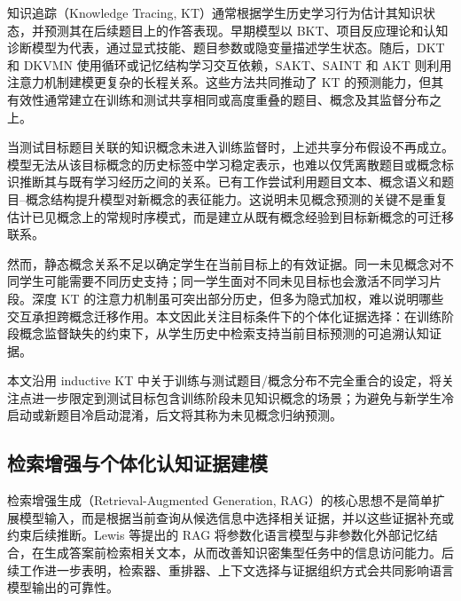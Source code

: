 \documentclass[UTF8,a4paper,12pt]{ctexart}
\numberwithin{table}{section}
\begin{document}
知识追踪（Knowledge Tracing, KT）通常根据学生历史学习行为估计其知识状态，并预测其在后续题目上的作答表现。早期模型以 BKT、项目反应理论和认知诊断模型为代表，通过显式技能、题目参数或隐变量描述学生状态\citep{corbett1995knowledge,chen2021irt,pavlik2009pfa,tatsuoka1983rulespace}。随后，DKT 和 DKVMN 使用循环或记忆结构学习交互依赖，SAKT、SAINT 和 AKT 则利用注意力机制建模更复杂的长程关系\citep{piech2015deep,zhang2017dynamic,pandey2019sakt,choi2020saint,ghosh2020akt}。这些方法共同推动了 KT 的预测能力，但其有效性通常建立在训练和测试共享相同或高度重叠的题目、概念及其监督分布之上。



当测试目标题目关联的知识概念未进入训练监督时，上述共享分布假设不再成立。模型无法从该目标概念的历史标签中学习稳定表示，也难以仅凭离散题目或概念标识推断其与既有学习经历之间的关系。已有工作尝试利用题目文本、概念语义和题目--概念结构提升模型对新概念的表征能力\citep{fu2024sinkt}。这说明未见概念预测的关键不是重复估计已见概念上的常规时序模式，而是建立从既有概念经验到目标新概念的可迁移联系。









然而，静态概念关系不足以确定学生在当前目标上的有效证据。同一未见概念对不同学生可能需要不同历史支持；同一学生面对不同未见目标也会激活不同学习片段。深度 KT 的注意力机制虽可突出部分历史，但多为隐式加权，难以说明哪些交互承担跨概念迁移作用。本文因此关注目标条件下的个体化证据选择：在训练阶段概念监督缺失的约束下，从学生历史中检索支持当前目标预测的可追溯认知证据。

本文沿用 inductive KT 中关于训练与测试题目/概念分布不完全重合的设定，将关注点进一步限定到测试目标包含训练阶段未见知识概念的场景；为避免与新学生冷启动或新题目冷启动混淆，后文将其称为未见概念归纳预测。

\subsection{检索增强与个体化认知证据建模}



检索增强生成（Retrieval-Augmented Generation, RAG）的核心思想不是简单扩展模型输入，而是根据当前查询从候选信息中选择相关证据，并以这些证据补充或约束后续推断。Lewis 等提出的 RAG 将参数化语言模型与非参数化外部记忆结合，在生成答案前检索相关文本，从而改善知识密集型任务中的信息访问能力\citep{lewis2020rag}。后续工作进一步表明，检索器、重排器、上下文选择与证据组织方式会共同影响语言模型输出的可靠性。
\end{document}
